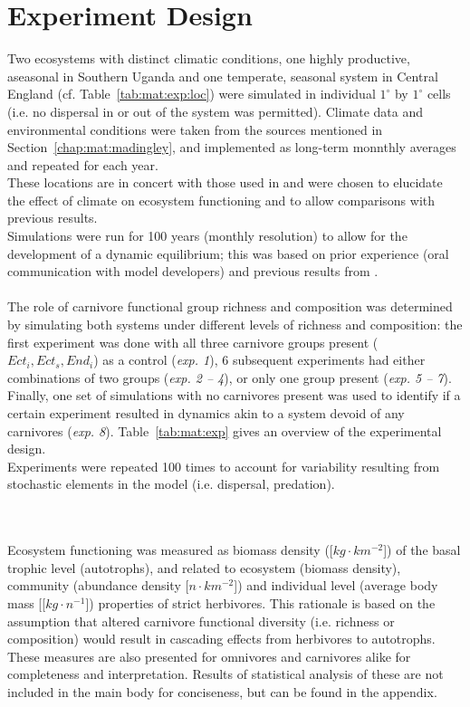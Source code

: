 \section{Experiment Design}
\label{chap:mat:exp}
Two ecosystems with distinct climatic conditions, one highly productive, aseasonal in Southern Uganda and one temperate, seasonal system in Central England (cf. Table~\ref{tab:mat:exp:loc}) were simulated in individual $1^\circ$ by $1^\circ$ cells (i.e. no dispersal in or out of the system was permitted). 
Climate data and environmental conditions were taken from the sources mentioned in Section~\ref{chap:mat:madingley}, and implemented as long-term monnthly averages and repeated for each year.\\

These locations are in concert with those used in \citet{Harfoot2014} and were chosen to elucidate the effect of climate on ecosystem functioning and to allow comparisons with previous results. 
\\
Simulations were run for 100 years (monthly resolution) to allow for the development of a dynamic equilibrium; 
this was based on prior experience (oral communication with model developers) and previous results from \cite{Harfoot2014}.
\\\\
The role of carnivore functional group richness and composition was determined by simulating both systems under different levels of richness and composition: 
the first experiment was done with all three carnivore groups present ($Ect_i, Ect_s, End_i$) as a control (\textit{exp. 1}), 6 subsequent experiments had either combinations of two groups (\textit{exp. 2 -- 4}), or only one group present (\textit{exp. 5 -- 7}). 
Finally, one set of simulations with no carnivores present was used to identify if a certain experiment resulted in dynamics akin to a system devoid of any carnivores (\textit{exp. 8}). Table~\ref{tab:mat:exp} gives an overview of the experimental design. \\
Experiments were repeated 100 times to account for variability resulting from stochastic elements in the model (i.e. dispersal, predation).

\\\\
Ecosystem functioning was measured as biomass density ([$kg\cdot km^{-2}$]) of the basal trophic level (autotrophs), and related to ecosystem (biomass density), community (abundance density [$n\cdot km^{-2}$]) and individual level (average body mass [[$kg\cdot n^{-1}$]) properties of strict herbivores. This rationale is based on the assumption that altered carnivore functional diversity (i.e. richness or composition) would result in cascading effects from herbivores to autotrophs. These measures are also presented for omnivores and carnivores alike for completeness and interpretation. Results of statistical analysis of these are not included in the main body for conciseness, but can be found in the appendix.
%
